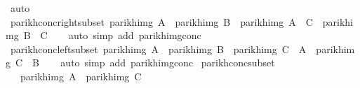 \begin{isabellebody}
\ auto\isanewline
{}\isamarkupfalse%
%
\endisatagproof
{\isafoldproof}%
%
\isadelimproof
\isanewline
%
\endisadelimproof
\isanewline
\isanewline
{}\isamarkupfalse%
\ parikh{\isacharunderscore}{\kern0pt}conc{\isacharunderscore}{\kern0pt}right{\isacharunderscore}{\kern0pt}subset{\isacharcolon}{\kern0pt}\ {\isachardoublequoteopen}parikh{\isacharunderscore}{\kern0pt}img\ A\ {\isasymsubseteq}\ parikh{\isacharunderscore}{\kern0pt}img\ B\ {\isasymLongrightarrow}\ parikh{\isacharunderscore}{\kern0pt}img\ {\isacharparenleft}{\kern0pt}A\ {\isacharat}{\kern0pt}{\isacharat}{\kern0pt}\ C{\isacharparenright}{\kern0pt}\ {\isasymsubseteq}\ parikh{\isacharunderscore}{\kern0pt}img\ {\isacharparenleft}{\kern0pt}B\ {\isacharat}{\kern0pt}{\isacharat}{\kern0pt}\ C{\isacharparenright}{\kern0pt}{\isachardoublequoteclose}\isanewline
%
\isadelimproof
\ \ %
\endisadelimproof
%
\isatagproof
{}\isamarkupfalse%
\ {\isacharparenleft}{\kern0pt}auto\ simp\ add{\isacharcolon}{\kern0pt}\ parikh{\isacharunderscore}{\kern0pt}img{\isacharunderscore}{\kern0pt}conc{\isacharparenright}{\kern0pt}%
\endisatagproof
{\isafoldproof}%
%
\isadelimproof
\isanewline
%
\endisadelimproof
\isanewline
{}\isamarkupfalse%
\ parikh{\isacharunderscore}{\kern0pt}conc{\isacharunderscore}{\kern0pt}left{\isacharunderscore}{\kern0pt}subset{\isacharcolon}{\kern0pt}\ {\isachardoublequoteopen}parikh{\isacharunderscore}{\kern0pt}img\ A\ {\isasymsubseteq}\ parikh{\isacharunderscore}{\kern0pt}img\ B\ {\isasymLongrightarrow}\ parikh{\isacharunderscore}{\kern0pt}img\ {\isacharparenleft}{\kern0pt}C\ {\isacharat}{\kern0pt}{\isacharat}{\kern0pt}\ A{\isacharparenright}{\kern0pt}\ {\isasymsubseteq}\ parikh{\isacharunderscore}{\kern0pt}img\ {\isacharparenleft}{\kern0pt}C\ {\isacharat}{\kern0pt}{\isacharat}{\kern0pt}\ B{\isacharparenright}{\kern0pt}{\isachardoublequoteclose}\isanewline
%
\isadelimproof
\ \ %
\endisadelimproof
%
\isatagproof
{}\isamarkupfalse%
\ {\isacharparenleft}{\kern0pt}auto\ simp\ add{\isacharcolon}{\kern0pt}\ parikh{\isacharunderscore}{\kern0pt}img{\isacharunderscore}{\kern0pt}conc{\isacharparenright}{\kern0pt}%
\endisatagproof
{\isafoldproof}%
%
\isadelimproof
\isanewline
%
\endisadelimproof
\isanewline
{}\isamarkupfalse%
\ parikh{\isacharunderscore}{\kern0pt}conc{\isacharunderscore}{\kern0pt}subset{\isacharcolon}{\kern0pt}\isanewline
\ \ \ {\isachardoublequoteopen}parikh{\isacharunderscore}{\kern0pt}img\ A\ {\isasymsubseteq}\ parikh{\isacharunderscore}{\kern0pt}img\ C{\isachardoublequoteclose}\isanewline

\end{isabellebody}
